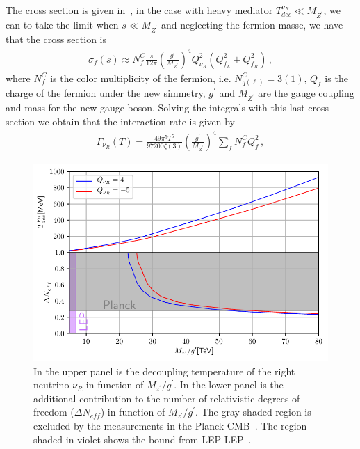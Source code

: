 \documentclass[12pt]{article}
\begin{document}
The cross section is given in~\cite{Barger:2003zh}, in the case with heavy mediator $T^{\nu_R}_{dec} \ll M_{Z^{\prime}}$, we can to take the limit when $s \ll M_{Z^{\prime}}$ and neglecting the fermion masse, we have that the cross section is
%
\begin{align*}
    \sigma_{f}(s) \approx N^{C}_{f} \frac{s}{12 \pi} \left( \frac{g^{\prime}}{M_{Z^{\prime}}} \right)^{4} Q^{2}_{\nu_R} (Q^{2}_{f_L} + Q^{2}_{f_R})\,,
\end{align*}
%
where $N^{C}_{f}$ is the color multiplicity of the fermion, i.e. $N^{C}_{q(\ell)} = 3(1)$, $Q_{f}$ is the charge of the fermion under the new simmetry, $g^{\prime}$ and $M_{Z^{\prime}}$ are the gauge coupling and mass for the new gauge boson. Solving the integrals with this last cross section we obtain that the interaction rate is given by
%
\begin{align*}
    \Gamma_{\nu_{R}}(T) = \frac{49 \pi^{5} T^{5}}{97200 \zeta(3)} \left( \frac{g^{\prime}}{M_{Z^{\prime}}} \right)^{4} \sum_{f} N^{C}_{f} Q^{2}_{f}\,,
\end{align*}
%
%
\begin{figure}
\centering
\includegraphics[scale=0.8]{DeltaNeff.pdf}
\caption{In the upper panel is the decoupling temperature of the right neutrino $\nu_{R}$ in function of $M_{z^{\prime}}/g^{\prime}$. In the lower panel is the additional contribution to the number of relativistic degrees of freedom ($\Delta N_{eff}$) in function of $M_{z^{\prime}}/g^{\prime}$. The gray shaded region is excluded by the measurements in the Planck CMB~\cite{Aghanim:2018eyx}. The region shaded in violet shows the bound from LEP  LEP~\cite{Alioli:2017nzr}.}
\label{fig:Neff}
\end{figure}
\end{document}
